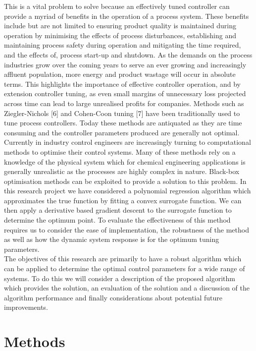 \documentclass[conference]{IEEEtran}
\theoremstyle{definition}
\begin{document}
This is a vital problem to solve because an effectively tuned controller can provide a myriad of benefits in the operation of a process system. These benefits include but are not limited to ensuring product quality is maintained during operation by minimising the effects of process disturbances, establishing and maintaining process safety during operation and mitigating the time required, and the effects of, process start-up and shutdown. As the demands on the process industries grow over the coming years to serve an ever growing and increasingly affluent population, more energy and product wastage will occur in absolute terms. This highlights the importance of effective controller operation, and by extension controller tuning, as even small margins of unnecessary loss projected across time can lead to large unrealised profits for companies. Methods such as Ziegler-Nichols [6] and Cohen-Coon tuning [7] have been traditionally used to tune process controllers. Today these methods are  antiquated as they are time consuming and the controller parameters produced are generally not optimal. Currently in industry control engineers are increasingly turning to computational methods to optimise their control systems. Many of these methods rely on a knowledge of the physical system which for chemical engineering applications is generally unrealistic as the processes are highly complex in nature. Black-box optimisation methods can be exploited to provide a solution to this problem. In this research project we have considered a polynomial regression algorithm which approximates the true function by fitting a convex surrogate function. We can then apply a derivative based gradient descent to the surrogate function to determine the optimum point. To evaluate the effectiveness of this method requires us to consider the ease of implementation, the robustness of the method as well as how the dynamic system response is for the optimum tuning parameters.\\

The objectives of this research are primarily to have a robust algorithm which can be applied to determine the optimal control parameters for a wide range of systems. To do this we will consider a description of the proposed algorithm which provides the solution, an evaluation of the solution and a discussion of the algorithm performance and finally considerations about potential future improvements.

\section{Methods}
\end{document}
